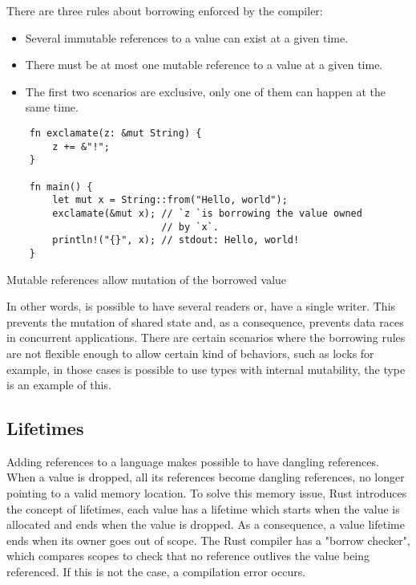 There are three rules about borrowing enforced by the compiler:
\begin{itemize}
    \item Several immutable references to a value can exist at a given time.
    \item There must be at most one mutable reference to a value at a given time.
    \item The first two scenarios are exclusive, only one of them can happen at the same time.
\end{itemize}

\begin{listing}[h]
	\begin{verbatim}
    fn exclamate(z: &mut String) {
        z += &"!";    
    }

    fn main() {
        let mut x = String::from("Hello, world");
        exclamate(&mut x); // `z `is borrowing the value owned 
                           // by `x`.
        println!("{}", x); // stdout: Hello, world!
    }
	\end{verbatim}
  \caption{Mutable references allow mutation of the borrowed value}
  \label{lst:mutable_ref}
\end{listing}

In other words, is possible to have several readers or, have a single writer.
This prevents the mutation of shared state and, as a consequence, prevents data
races in concurrent applications. There are certain scenarios where the
borrowing rules are not flexible enough to allow certain kind of behaviors,
such as locks for example, in those cases is possible to use types with
internal mutability, the  type is an example of this.

\subsection{Lifetimes}

Adding references to a language makes possible to have dangling references. When
a value is dropped, all its references become dangling references, no longer
pointing to a valid memory location. To solve this memory issue, Rust introduces
the concept of lifetimes, each value has a lifetime which starts when the value
is allocated and ends when the value is dropped. As a consequence, a value
lifetime ends when its owner goes out of scope. The Rust compiler has a "borrow
checker", which compares scopes to check that no reference outlives the value
being referenced. If this is not the case, a compilation error occurs.

